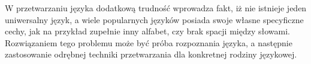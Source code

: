 \noindent W przetwarzaniu języka dodatkową trudność wprowadza fakt, iż nie istnieje jeden uniwersalny język, a wiele popularnych języków posiada swoje własne specyficzne cechy, jak na przykład zupełnie inny alfabet, czy brak spacji między słowami. Rozwiązaniem tego problemu może być próba rozpoznania języka, a następnie zastosowanie odrębnej techniki przetwarzania dla konkretnej rodziny językowej.
